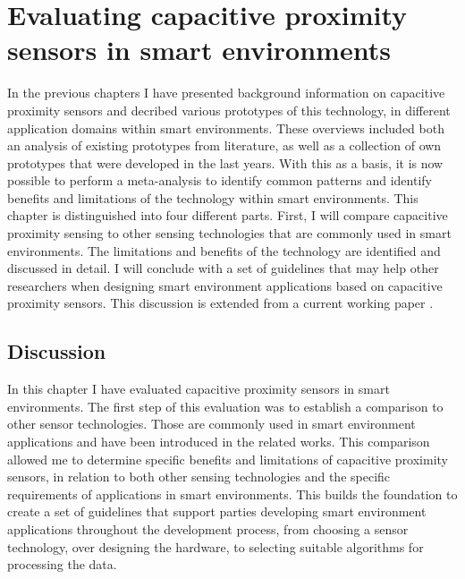 \chapter{Evaluating capacitive proximity sensors in smart environments}
\label{ch:eval}
In the previous chapters I have presented background information on capacitive proximity sensors and decribed various prototypes of this technology, in different application domains within smart environments. These overviews included both an analysis of existing prototypes from literature, as well as a collection of own prototypes that were developed in the last years. With this as a basis, it is now possible to perform a meta-analysis to identify common patterns and identify benefits and limitations of the technology within smart environments. This chapter is distinguished into four different parts. First, I will compare capacitive proximity sensing to other sensing technologies that are commonly used in smart environments. The limitations and benefits of the technology are identified and discussed in detail. I will conclude with a set of guidelines that may help other researchers when designing smart environment applications based on capacitive proximity sensors. This discussion is extended from a current working paper \cite{braun2014capjaise}.





\section{Discussion}
In this chapter I have evaluated capacitive proximity sensors in smart environments. The first step of this evaluation was to establish a comparison to other sensor technologies. Those are commonly used in smart environment applications and have been introduced in the related works. This comparison allowed me to determine specific benefits and limitations of capacitive proximity sensors, in relation to both other sensing technologies and the specific requirements of applications in smart environments. This builds the foundation to create a set of guidelines that support parties developing smart environment applications throughout the development process, from choosing a sensor technology, over designing the hardware, to selecting suitable algorithms for processing the data.